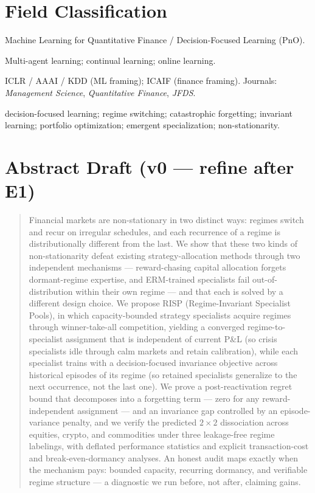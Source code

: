 \documentclass[11pt]{article}
\newcommand{\risp}{\textsc{RISP}}
\begin{document}
\section{Field Classification}
\begin{description}[leftmargin=1.6em]
  \item[Primary field:] Machine Learning for Quantitative Finance / Decision-Focused Learning (PnO).
  \item[Secondary:] Multi-agent learning; continual learning; online learning.
  \item[Venues:] ICLR / AAAI / KDD (ML framing); ICAIF (finance framing). Journals: \emph{Management Science}, \emph{Quantitative Finance}, \emph{JFDS}.
  \item[Keywords:] decision-focused learning; regime switching; catastrophic forgetting; invariant learning; portfolio optimization; emergent specialization; non-stationarity.
\end{description}

\section{Abstract Draft (v0 --- refine after E1)}
\begin{quote}\small
Financial markets are non-stationary in two distinct ways: regimes switch and recur on irregular schedules, and each recurrence of a regime is distributionally different from the last. We show that these two kinds of non-stationarity defeat existing strategy-allocation methods through two independent mechanisms --- reward-chasing capital allocation forgets dormant-regime expertise, and ERM-trained specialists fail out-of-distribution within their own regime --- and that each is solved by a different design choice. We propose \risp{} (Regime-Invariant Specialist Pools), in which capacity-bounded strategy specialists acquire regimes through winner-take-all competition, yielding a converged regime-to-specialist assignment that is independent of current P\&L (so crisis specialists idle through calm markets and retain calibration), while each specialist trains with a decision-focused invariance objective across historical episodes of its regime (so retained specialists generalize to the next occurrence, not the last one). We prove a post-reactivation regret bound that decomposes into a forgetting term --- zero for any reward-independent assignment --- and an invariance gap controlled by an episode-variance penalty, and we verify the predicted $2\times2$ dissociation across equities, crypto, and commodities under three leakage-free regime labelings, with deflated performance statistics and explicit transaction-cost and break-even-dormancy analyses. An honest audit maps exactly when the mechanism pays: bounded capacity, recurring dormancy, and verifiable regime structure --- a diagnostic we run before, not after, claiming gains.
\end{quote}
\end{document}
